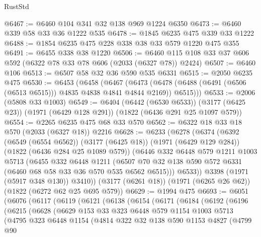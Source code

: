 \begin{lexlean}{RustStd}
\begin{coremodule}
@6467 := @6460 @104 @341 @32 @138 @969 @1224 @6350
@6473 := @6460 @339 @58 @33 @36 @1222 @535
@6478 := @1845 @6235 @475 @339 @33 @1222
@6488 := @1854 @6235 @475 @228 @338 @38 @33 @579 @1220 @475 @355
@6491 := @6455 @338 @38 @1220
@6506 := @6460 @115 @108 @33 @37 @606 @592 (@6322 @78 @33 @78 @606 (@2033 (@6327 @78)) @2424)
@6507 := @6460 @106
@6513 := @6507 @58 @32 @36 @590 @535 @6331
@6515 := @2050 @6235 @475
@6530 := @6453
    (@6458
      (@6467
        (@6473 (@6478 (@6488 (@6491 (@6506 (@6513 @6515))) @4835 @4838 @4841 @4844 @2169)) @6515)))
@6533 := @2006 (@5808 @33 @1003)
@6549 := @6404
    (@6442 (@6530 @6533))
    (@3177 (@6425 @23))
    (@1971 (@6429 @128 @291))
    (@1822 (@6436 @291 @25 @1097 @579))
@6554 := @2265 @6235 @475 @68 @33 @570
@6562 := @6322 @18 @33 @18 @570 (@2033 (@6327 @18)) @2216
@6628 := @6233
    (@6278
      (@6374
        (@6392
          (@6549 (@6554 @6562))
          (@3177 (@6425 @18))
          (@1971 (@6429 @129 @284))
          (@1822 (@6436 @284 @25 @1089 @579))
          (@6446
            @332
            @6448
            @579
            @1211
            @1003
            @5713
            (@6455
              @332
              @6448
              @1211
              (@6507 @70 @32 @138 @590 @572 @6331 (@6460 @68 @58 @33 @36 @570 @535 @6562 @6515)))
            @6533))
        @3398
        (@1971 (@5917 @348 @130))
        @3410))
    (@3177 (@6261 @18))
    (@1971 (@6265 @26 @62))
    (@1822 (@6272 @62 @25 @695 @579))
@6629 := @1994 @475
@6693 := @6051
    (@6076
      (@6117
        (@6119
          (@6121
            (@6138
              (@6154
                (@6171
                  (@6184
                    (@6192
                      (@6196
                        (@6215
                          (@6628
                            (@6629
                              @153
                              @33
                              @323
                              @6448
                              @579
                              @1154
                              @1003
                              @5713
                              (@4795
                                @323
                                @6448
                                @1154
                                (@4814
                                  @322
                                  @32
                                  @138
                                  @590
                                  @1153
                                  @4827
                                  (@4799
                                    @90

\end{coremodule}
\end{lexlean}
